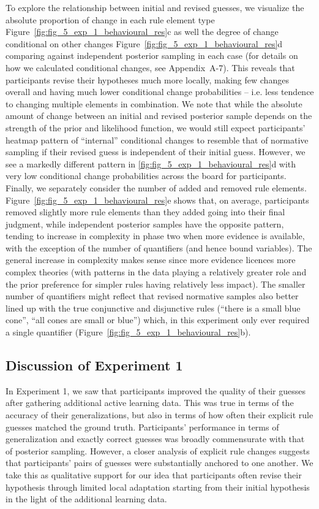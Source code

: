\documentclass[doc,natbib,floatsintext]{apa7}
\begin{document}
To explore the relationship between initial and revised guesses, we visualize the absolute proportion of change in each rule element type Figure~\ref{fig:fig_5_exp_1_behavioural_res}c as well the degree of change conditional on other changes Figure~\ref{fig:fig_5_exp_1_behavioural_res}d comparing against independent posterior sampling in each case (for details on how we calculated conditional changes, see Appendix~A-7). This reveals that participants revise their hypotheses much more locally, making few changes overall and having much lower conditional change probabilities -- i.e. less tendence to changing multiple elements in combination. We note that while the absolute amount of change between an initial and revised posterior sample depends on the strength of the prior and likelihood function, we would still expect participants' heatmap pattern of ``internal'' conditional changes to resemble that of normative sampling if their revised guess is independent of their initial guess. However, we see a markedly different pattern in \ref{fig:fig_5_exp_1_behavioural_res}d with very low conditional change probabilities across the board for participants. Finally, we separately consider the number of added and removed rule elements. Figure~\ref{fig:fig_5_exp_1_behavioural_res}e shows that, on average, participants removed slightly more rule elements than they added going into their final judgment, while independent posterior samples have the opposite pattern, tending to increase in complexity in phase two when more evidence is available, with the exception of the number of quantifiers (and hence bound variables). The general increase in complexity makes sense since more evidence licences more complex theories (with patterns in the data playing a relatively greater role and the prior preference for simpler rules having relatively less impact). The smaller number of quantifiers might reflect that revised normative samples also better lined up with the true conjunctive and disjunctive rules (``there is a small blue cone'', ``all cones are small or blue'') which, in this experiment only ever required a single quantifier (Figure~\ref{fig:fig_5_exp_1_behavioural_res}b).

\subsection{Discussion of Experiment 1}
In Experiment 1, we saw that participants improved the quality of their guesses after gathering additional active learning data. This was true in terms of the accuracy of their generalizations, but also in terms of how often their explicit rule guesses matched the ground truth. Participants' performance in terms of generalization and exactly correct guesses was broadly commensurate with that of posterior sampling. However, a closer analysis of explicit rule changes suggests that participants' pairs of guesses were substantially anchored to one another. We take this as qualitative support for our idea that participants often revise their hypothesis through limited local adaptation starting from their initial hypothesis in the light of the additional learning data. 
\end{document}
